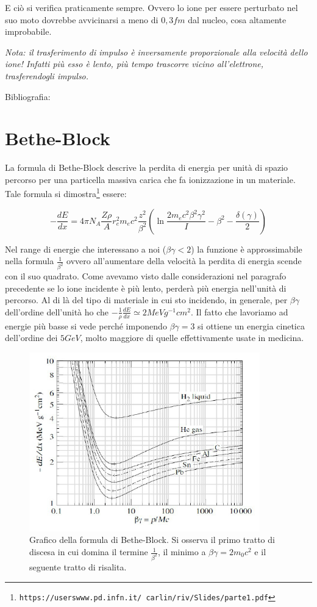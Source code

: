 E ciò si verifica praticamente sempre. Ovvero lo ione per essere perturbato nel suo moto dovrebbe avvicinarsi a meno di $0,3 fm$ dal nucleo, cosa altamente improbabile.

\emph{Nota: il trasferimento di impulso è inversamente proporzionale alla velocità dello ione! Infatti più esso è lento, più tempo trascorre vicino all'elettrone, trasferendogli impulso.}

Bibliografia: \cite{Longo}

\section{Bethe-Block}

La formula di Bethe-Block descrive la perdita di energia per unità di spazio percorso per una particella massiva carica che fa ionizzazione in un materiale. Tale formula si dimostra\footnote{\texttt{https://userswww.pd.infn.it/~carlin/riv/Slides/parte1.pdf}} essere:

\begin{equation}
-\frac{dE}{dx}=4\pi N_A\frac{Z\rho}{A}r_e^2m_ec^2\frac{z^2}{\beta^2}(\ln\frac{2m_ec^2\beta^2\gamma^2}{I}-\beta^2-\frac{\delta(\gamma)}{2})
\end{equation}

Nel range di energie che interessano a noi ($\beta\gamma<2$) la funzione è approssimabile nella formula $\frac{1}{\beta^2}$ ovvero all'aumentare della velocità la perdita di energia scende con il suo quadrato. Come avevamo visto dalle considerazioni nel paragrafo precedente se lo ione incidente è più lento, perderà più energia nell'unità di percorso. Al di là del tipo di materiale in cui sto incidendo, in generale, per $\beta\gamma$ dell'ordine dell'unità ho che $-\frac{1}{\rho}\frac{dE}{dx}\simeq2MeV g^{-1}cm^{2}$.
Il fatto che lavoriamo ad energie più basse si vede perché imponendo $\beta\gamma=3$ si ottiene un energia cinetica dell'ordine dei $5 GeV$, molto maggiore di quelle effettivamente usate in medicina.

\begin{figure}
\centering
	\includegraphics[width=10cm, keepaspectratio]{figs/bethe.png}
	\caption{Grafico della formula di Bethe-Block. Si osserva il primo tratto di discesa in cui domina il termine $\frac{1}{\beta^2}$, il minimo a $\beta\gamma=2m_0c^2$ e il seguente tratto di risalita.}
	\label{fig:bethe}
\end{figure}



